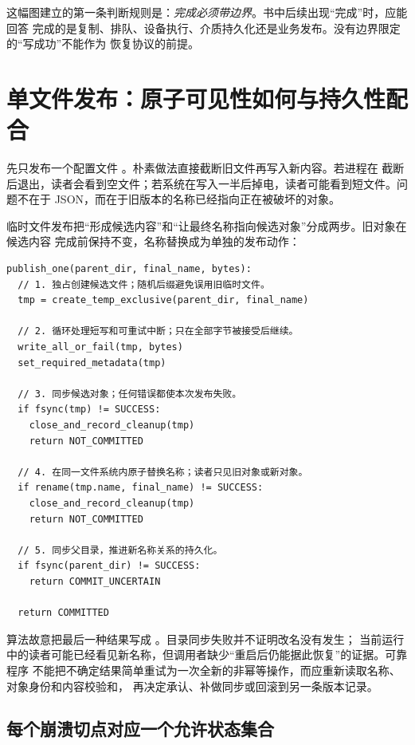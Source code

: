 这幅图建立的第一条判断规则是：\emph{完成必须带边界}。书中后续出现“完成”时，应能回答
完成的是复制、排队、设备执行、介质持久化还是业务发布。没有边界限定的“写成功”不能作为
恢复协议的前提。

\section{单文件发布：原子可见性如何与持久性配合}

先只发布一个配置文件 。朴素做法直接截断旧文件再写入新内容。若进程在
截断后退出，读者会看到空文件；若系统在写入一半后掉电，读者可能看到短文件。问题不在于
JSON，而在于旧版本的名称已经指向正在被破坏的对象。

临时文件发布把“形成候选内容”和“让最终名称指向候选对象”分成两步。旧对象在候选内容
完成前保持不变，名称替换成为单独的发布动作：

\begin{lstlisting}
publish_one(parent_dir, final_name, bytes):
  // 1. 独占创建候选文件；随机后缀避免误用旧临时文件。
  tmp = create_temp_exclusive(parent_dir, final_name)

  // 2. 循环处理短写和可重试中断；只在全部字节被接受后继续。
  write_all_or_fail(tmp, bytes)
  set_required_metadata(tmp)

  // 3. 同步候选对象；任何错误都使本次发布失败。
  if fsync(tmp) != SUCCESS:
    close_and_record_cleanup(tmp)
    return NOT_COMMITTED

  // 4. 在同一文件系统内原子替换名称；读者只见旧对象或新对象。
  if rename(tmp.name, final_name) != SUCCESS:
    close_and_record_cleanup(tmp)
    return NOT_COMMITTED

  // 5. 同步父目录，推进新名称关系的持久化。
  if fsync(parent_dir) != SUCCESS:
    return COMMIT_UNCERTAIN

  return COMMITTED
\end{lstlisting}

算法故意把最后一种结果写成 。目录同步失败并不证明改名没有发生；
当前运行中的读者可能已经看见新名称，但调用者缺少“重启后仍能据此恢复”的证据。可靠程序
不能把不确定结果简单重试为一次全新的非幂等操作，而应重新读取名称、对象身份和内容校验和，
再决定承认、补做同步或回滚到另一条版本记录。

\subsection{每个崩溃切点对应一个允许状态集合}

